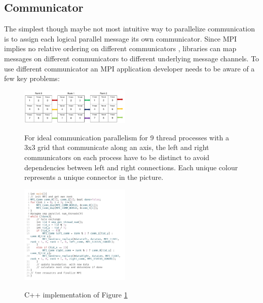 \documentclass[sigconf]{acmart}
\begin{document}
\subsection{Communicator}

The simplest though maybe not most intuitive way to parallelize communication is to assign each logical parallel message its own communicator.
Since MPI implies no relative ordering on different communicators \cite{zambreLessonsLearned2022}, libraries can map messages on different communicators to different underlying message channels.
To use different communicator an MPI application developer needs to be aware of a few key problems:

\begin{figure}
    \caption{
        For ideal communication parallelism for 9 thread processes with a 3x3 grid that communicate along an axis, the left and right communicators on each process have to be distinct to avoid dependencies between left and right connections.
        Each unique colour represents a unique connector in the picture.
    }
    \includegraphics[width=0.47\textwidth]{Communicator_Line.png}
    \label{fig:Communicator_Line}
\end{figure}

\begin{figure}
    \caption{C++ implementation of Figure \ref{fig:Communicator_Line}}
    \includegraphics[width=0.47\textwidth]{Communicator_Line_CPP.png}
    \label{fig:Communicator_Line_CPP}
\end{figure}
\end{document}

